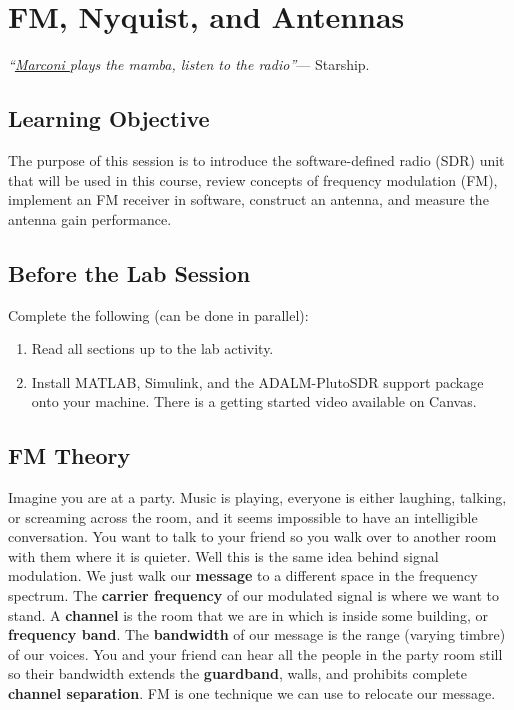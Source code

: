 \newpage
\section{FM, Nyquist, and Antennas}
\textit{``\href{https://en.wikipedia.org/wiki/Guglielmo_Marconi}{Marconi }plays the mamba, listen to the radio''}--- Starship.

\setcounter{subsection}{-1}

\subsection{Learning Objective}
The purpose of this session is to introduce the software-defined radio (SDR) unit that will be used in this course, review concepts of frequency modulation (FM), implement an FM receiver in software, construct an antenna, and measure the antenna gain performance.

\subsection{Before the Lab Session} 
Complete the following (can be done in parallel):
\begin{enumerate}
    \item Read all sections up to the lab activity.
    \item Install MATLAB, Simulink, and the ADALM-PlutoSDR support package onto your machine. There is a getting started video available on Canvas.

\end{enumerate}



\subsection{FM Theory}
Imagine you are at a party. Music is playing, everyone is either laughing, talking, or screaming across the room, and it seems impossible to have an intelligible conversation. You want to talk to your friend so you walk over to another room with them where it is quieter. Well this is the same idea behind signal modulation. We just walk our \textbf{message} to a different space in the frequency spectrum. The \textbf{carrier frequency} of our modulated signal is where we want to stand. A \textbf{channel} is the room that we are in which is inside some building, or \textbf{frequency band}. The \textbf{bandwidth} of our message is the range (varying timbre) of our voices. You and your friend can hear all the people in the party room still so their bandwidth extends the \textbf{guardband}, walls, and  prohibits complete \textbf{channel separation}. FM is one technique we can use to relocate our message.

